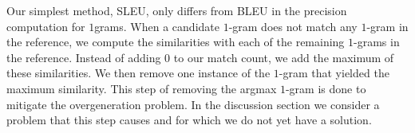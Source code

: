 

Our simplest method, SLEU,  only differs from BLEU in the precision computation for $1$grams. 
When a candidate $1$-gram does not match any $1$-gram in the reference, we compute the similarities with each of the remaining $1$-grams in the reference. 
Instead of adding $0$ to our match count, we add the maximum of these similarities. 
We then remove one instance of the $1$-gram that yielded the maximum similarity. 
This step of removing the argmax $1$-gram is done to mitigate the overgeneration problem. 
In the discussion section we consider a problem that this step causes and for which we do not yet have a solution. 

